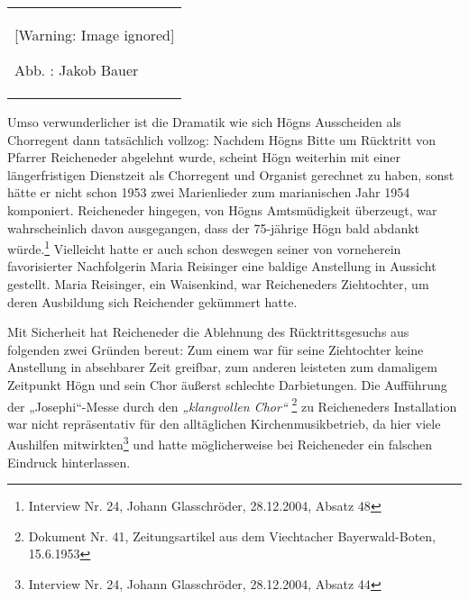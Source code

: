 \documentclass[a4paper]{article}
\newcommand\textstyleZitate[1]{\textit{#1}}
\newcommand\textstyleFootnoteSymbol[1]{\textsuperscript{#1}}
\newcounter{Abb}
\renewcommand\theAbb{\arabic{Abb}}
\begin{document}
\begin{center}
\begin{minipage}{4.032cm}
\begin{flushleft}
\tablefirsthead{}
\tablehead{}
\tabletail{}
\tablelasttail{}
\begin{supertabular}{m{3.832cm}}
  [Warning: Image ignored] %
 
Abb. \stepcounter{Abb}{\theAbb}: Jakob Bauer\\
\end{supertabular}
\end{flushleft}
\end{minipage}
\end{center}
Umso verwunderlicher ist die Dramatik wie sich Högns Ausscheiden als
Chorregent dann tatsächlich vollzog: Nachdem Högns Bitte um Rücktritt
von Pfarrer Reicheneder abgelehnt wurde, scheint Högn weiterhin mit
einer längerfristigen Dienstzeit als Chorregent und Organist gerechnet
zu haben, sonst hätte er nicht schon 1953 zwei Marienlieder zum
marianischen Jahr 1954 komponiert. Reicheneder hingegen, von Högns
Amtsmüdigkeit überzeugt, war wahrscheinlich davon ausgegangen, dass der
75-jährige Högn bald abdankt würde.\footnote{ Interview Nr. 24, Johann
Glasschröder, 28.12.2004, Absatz 48} Vielleicht hatte er auch schon
deswegen seiner von vorneherein favorisierter Nachfolgerin Maria
Reisinger eine baldige Anstellung in Aussicht gestellt. Maria
Reisinger, ein Waisenkind, war Reicheneders Ziehtochter, um deren
Ausbildung sich Reichender gekümmert hatte. 

Mit Sicherheit hat Reicheneder die Ablehnung des Rücktrittsgesuchs aus
folgenden zwei Gründen bereut: Zum einem war für seine Ziehtochter
keine Anstellung in absehbarer Zeit greifbar, zum anderen leisteten zum
damaligem Zeitpunkt Högn und sein Chor äußerst schlechte Darbietungen.
Die Aufführung der „Josephi“-Messe durch den
\textstyleZitate{„klangvollen Chor“}\textstyleFootnoteSymbol{
}\footnote{ Dokument Nr. 41, Zeitungsartikel aus dem Viechtacher
Bayerwald-Boten, 15.6.1953} zu Reicheneders Installation war nicht
repräsentativ für den alltäglichen Kirchenmusikbetrieb, da hier viele
Aushilfen mitwirkten\footnote{ Interview Nr. 24, Johann Glasschröder,
28.12.2004, Absatz 44} und hatte möglicherweise bei Reicheneder ein
falschen Eindruck hinterlassen. 
\end{document}
